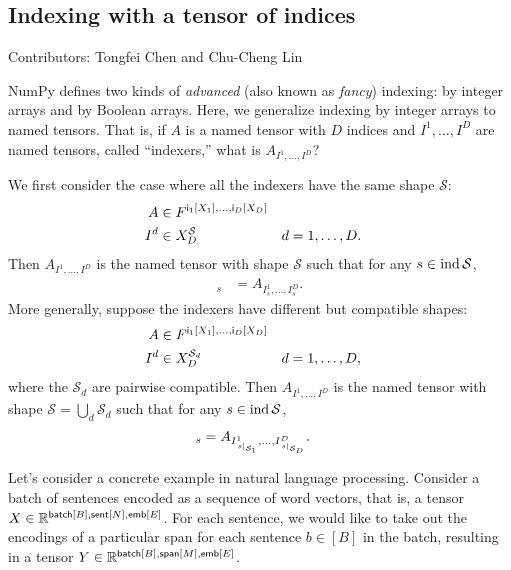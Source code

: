 \subsection{Indexing with a tensor of indices}

Contributors: Tongfei Chen and Chu-Cheng Lin

NumPy defines two kinds of \emph{advanced} (also known as \emph{fancy}) indexing: by integer arrays and by Boolean arrays. Here, we generalize indexing by integer arrays to named tensors. That is, if $A$ is a named tensor with $D$ indices and $I^1, \ldots, I^D$ are named tensors, called ``indexers,'' what is $A_{I^1, \ldots, I^D}$?

We first consider the case where all the indexers have the same shape $\mathcal{S}$:
\begin{align*}
  A &\in F^{\mathsf{i_\text{$1$}}[X_1], \ldots, \mathsf{i_\text{$D$}}[X_D]} \\
  I^d &\in X_D^{\mathcal{S}} & d &= 1, \ldots, D.
\end{align*}
Then $A_{I^1, \ldots, I^D}$ is the named tensor with shape $\mathcal{S}$ such that for any $s \in \operatorname{ind}{\mathcal{S}}$,
\begin{align*}
  [A_{I^1, \ldots, I^D}]_s &= A_{I^1_s, \ldots, I^D_s}.
\end{align*}
More generally, suppose the indexers have different but compatible shapes:
\begin{align*}
  A &\in F^{\mathsf{i_\text{$1$}}[X_1], \ldots, \mathsf{i_\text{$D$}}[X_D]} \\
  I^d &\in X_D^{\mathcal{S}_d} & d &= 1, \ldots, D,
\end{align*}
where the $\mathcal{S}_d$ are pairwise compatible. Then $A_{I^1, \ldots, I^D}$ is the named tensor with shape $\mathcal{S} = \bigcup_d \mathcal{S}_d$ such that for any $s \in \operatorname{ind}{\mathcal{S}}$,
\begin{align*}
  [A_{I^1, \ldots, I^D}]_s &= A_{I^1_{\tuplerestrict{s}{\mathcal{S}_1}}, \ldots, I^D_{\tuplerestrict{s}{\mathcal{S}_D}}}.
\end{align*}

Let's consider a concrete example in natural language processing. Consider a batch of sentences encoded as a sequence of word vectors, that is, a tensor $X \in \mathbb{R}^{\mathsf{batch}[B], \mathsf{sent}[N], \mathsf{emb}[E]}$. For each sentence, we would like to take out the encodings of a particular span for each sentence $b \in [B]$ in the batch, resulting in a tensor $Y \in \mathbb{R}^{\mathsf{batch}[B], \mathsf{span}[M], \mathsf{emb}[E]}$.

